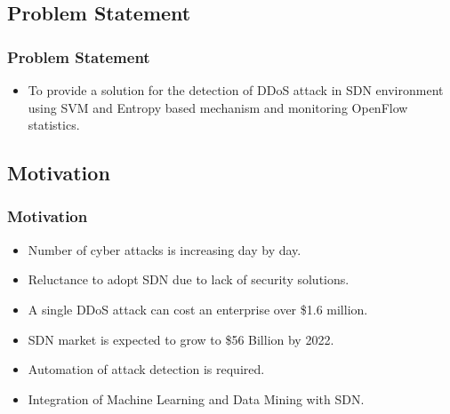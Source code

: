 \documentclass[10pt]{beamer}
\begin{document}
\begin{frame}
\section[]{Problem Statement}
\frametitle{Problem Statement}
\begin{itemize}
\footnotesize
\item
To provide a solution for the detection of DDoS attack in SDN environment using SVM and Entropy based mechanism and monitoring OpenFlow statistics.
\end{itemize}
\end{frame}




\begin{frame}
\section[]{Motivation}
\frametitle{Motivation}
\begin{center}
\begin{itemize}
\footnotesize
\item 
Number of cyber attacks is increasing day by day.
\item
Reluctance to adopt SDN due to lack of security solutions.
\item
A single DDoS attack can cost an enterprise over \$1.6 million.
\item
SDN market is expected to grow to \$56 Billion by 2022.
\item
Automation of attack detection is required.
\item
Integration of Machine Learning and Data Mining with SDN. 
\end{itemize}
\end{center}

\end{frame}
\end{document}

